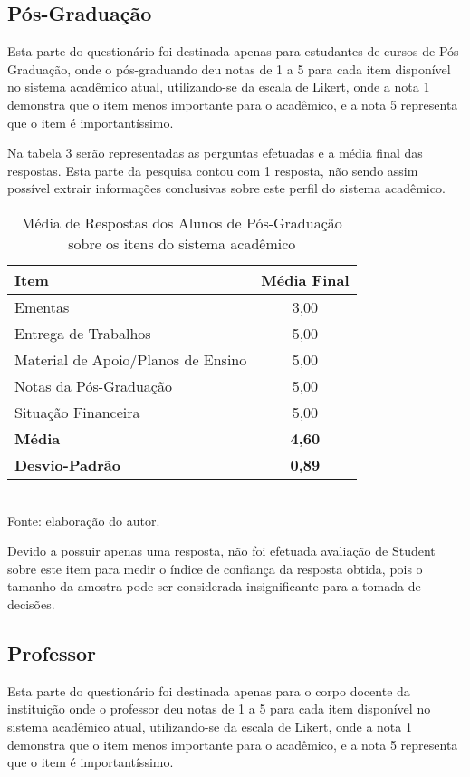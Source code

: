 \subsection{Pós-Graduação}
Esta parte do questionário foi destinada apenas para estudantes de cursos de Pós-Graduação, onde o pós-graduando deu notas de 1 a 5 para cada item disponível no sistema acadêmico atual, utilizando-se da escala de Likert, onde  a nota 1 demonstra que o item menos importante para o acadêmico, e a nota 5 representa que o item é importantíssimo.

Na tabela 3 serão representadas as perguntas efetuadas e a média final das respostas. Esta parte da pesquisa contou com 1 resposta, não sendo assim possível extrair informações conclusivas sobre este perfil do sistema acadêmico.

\begin{table}[!hbt]
\centering
\caption[Média de Respostas dos Alunos de Pós-Graduação]{Média de Respostas dos Alunos de Pós-Graduação sobre os itens do sistema acadêmico}
\vspace{3mm}
\begin{tabular}{p{9.5cm}|c}\hline
\textbf{Item} & \textbf{Média Final} \\ \hline
Ementas & 3,00 \\ \hline
Entrega de Trabalhos & 5,00 \\ \hline
Material de Apoio/Planos de Ensino & 5,00 \\ \hline
Notas da Pós-Graduação & 5,00 \\ \hline
Situação Financeira & 5,00 \\ \hline
\textbf{Média} & \textbf{4,60} \\ \hline
\textbf{Desvio-Padrão} & \textbf{0,89} \\ \hline
\end{tabular}
\\ Fonte: elaboração do autor.
\end{table}

Devido a possuir apenas uma resposta, não foi efetuada avaliação de Student sobre este item para medir o índice de confiança da resposta obtida, pois o tamanho da amostra pode ser considerada insignificante para a tomada de decisões.

\subsection{Professor}
Esta parte do questionário foi destinada apenas para o corpo docente da instituição onde o professor deu notas de 1 a 5 para cada item disponível no sistema acadêmico atual, utilizando-se da escala de Likert, onde  a nota 1 demonstra que o item menos importante para o acadêmico, e a nota 5 representa que o item é importantíssimo.

